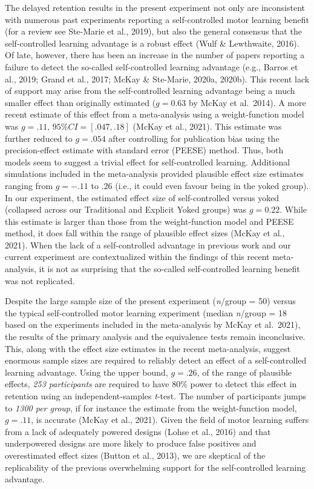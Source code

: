 \documentclass[
  english,
  jou]{apa7}
\begin{document}
The delayed retention results in the present experiment not only are inconsistent with numerous past experiments reporting a self-controlled motor learning benefit (for a review see Ste-Marie et al., 2019), but also the general consensus that the self-controlled learning advantage is a robust effect (Wulf \& Lewthwaite, 2016). Of late, however, there has been an increase in the number of papers reporting a failure to detect the so-called self-controlled learning advantage (e.g., Barros et al., 2019; Grand et al., 2017; McKay \& Ste-Marie, 2020a, 2020b). This recent lack of support may arise from the self-controlled learning advantage being a much smaller effect than originally estimated (\(g = 0.63\) by McKay et al.~2014). A more recent estimate of this effect from a meta-analysis using a weight-function model was \(g = .11, \,95\% CI = [.047, .18]\) (McKay et al., 2021). This estimate was further reduced to \(g = .054\) after controlling for publication bias using the precision-effect estimate with standard error (PEESE) method. Thus, both models seem to suggest a trivial effect for self-controlled learning. Additional simulations included in the meta-analysis provided plausible effect size estimates ranging from \(g = -.11\) to \(.26\) (i.e., it could even favour being in the yoked group). In our experiment, the estimated effect size of self-controlled versus yoked (collapsed across our Traditional and Explicit Yoked groups) was \(g = 0.22\). While this estimate is larger than those from the weight-function model and PEESE method, it does fall within the range of plausible effect sizes (McKay et al., 2021). When the lack of a self-controlled advantage in previous work and our current experiment are contextualized within the findings of this recent meta-analysis, it is not as surprising that the so-called self-controlled learning benefit was not replicated.

Despite the large sample size of the present experiment (\emph{n}/group = 50) versus the typical self-controlled motor learning experiment (median \emph{n}/group = 18 based on the experiments included in the meta-analysis by McKay et al.~2021), the results of the primary analysis and the equivalence tests remain inconclusive. This, along with the effect size estimates in the recent meta-analysis, suggest enormous sample sizes are required to reliably detect an effect of a self-controlled learning advantage. Using the upper bound, \(g = .26\), of the range of plausible effects, \emph{253 participants} are required to have 80\% power to detect this effect in retention using an independent-samples \emph{t}-test. The number of participants jumps to \emph{1300 per group}, if for instance the estimate from the weight-function model, \(g = .11\), is accurate (McKay et al., 2021). Given the field of motor learning suffers from a lack of adequately powered designs (Lohse et al., 2016) and that underpowered designs are more likely to produce false positives and overestimated effect sizes (Button et al., 2013), we are skeptical of the replicability of the previous overwhelming support for the self-controlled learning advantage.
\end{document}

